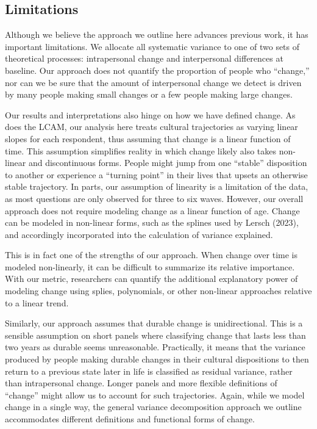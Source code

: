 \documentclass[
  11pt,
]{article}
\begin{document}
\subsection{Limitations}\label{limitations}

Although we believe the approach we outline here advances previous work,
it has important limitations. We allocate all systematic variance to one
of two sets of theoretical processes: intrapersonal change and
interpersonal differences at baseline. Our approach does not quantify
the proportion of people who ``change,'' nor can we be sure that the
amount of interpersonal change we detect is driven by many people making
small changes or a few people making large changes.

Our results and interpretations also hinge on how we have defined
change. As does the LCAM, our analysis here treats cultural trajectories
as varying linear slopes for each respondent, thus assuming that change
is a linear function of time. This assumption simplifies reality in
which change likely also takes non-linear and discontinuous forms.
People might jump from one ``stable'' disposition to another or
experience a ``turning point'' in their lives that upsets an otherwise
stable trajectory. In parts, our assumption of linearity is a limitation
of the data, as most questions are only observed for three to six waves.
However, our overall approach does not require modeling change as a
linear function of age. Change can be modeled in non-linear forms, such
as the splines used by Lersch (2023), and accordingly incorporated into
the calculation of variance explained.

This is in fact one of the strengths of our approach. When change over
time is modeled non-linearly, it can be difficult to summarize its
relative importance. With our metric, researchers can quantify the
additional explanatory power of modeling change using splies,
polynomials, or other non-linear approaches relative to a linear trend.

Similarly, our approach assumes that durable change is unidirectional.
This is a sensible assumption on short panels where classifying change
that lasts less than two years as durable seems unreasonable.
Practically, it means that the variance produced by people making
durable changes in their cultural dispositions to then return to a
previous state later in life is classified as residual variance, rather
than intrapersonal change. Longer panels and more flexible definitions
of ``change'' might allow us to account for such trajectories. Again,
while we model change in a single way, the general variance
decomposition approach we outline accommodates different definitions and
functional forms of change.
\end{document}
